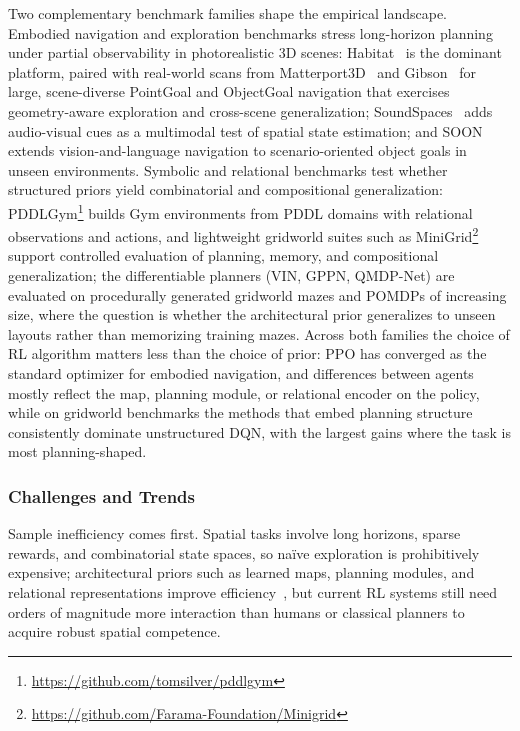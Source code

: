 Two complementary benchmark families shape the empirical landscape.
Embodied navigation and exploration benchmarks stress long-horizon planning under partial observability in photorealistic 3D scenes: Habitat~\cite{savva2019habitat} is the dominant platform, paired with real-world scans from Matterport3D~\cite{chang2017matterport3d} and Gibson~\cite{Xia2018Gibson} for large, scene-diverse PointGoal and ObjectGoal navigation that exercises geometry-aware exploration and cross-scene generalization; SoundSpaces~\cite{chen2020soundspaces} adds audio-visual cues as a multimodal test of spatial state estimation; and SOON~\cite{zhu2021soon} extends vision-and-language navigation to scenario-oriented object goals in unseen environments.
Symbolic and relational benchmarks test whether structured priors yield combinatorial and compositional generalization: PDDLGym\footnote{\url{https://github.com/tomsilver/pddlgym}} builds Gym environments from PDDL domains with relational observations and actions, and lightweight gridworld suites such as MiniGrid\footnote{\url{https://github.com/Farama-Foundation/Minigrid}} support controlled evaluation of planning, memory, and compositional generalization; the differentiable planners (VIN, GPPN, QMDP-Net) are evaluated on procedurally generated gridworld mazes and POMDPs of increasing size, where the question is whether the architectural prior generalizes to unseen layouts rather than memorizing training mazes.
Across both families the choice of RL algorithm matters less than the choice of prior: PPO has converged as the standard optimizer for embodied navigation, and differences between agents mostly reflect the map, planning module, or relational encoder on the policy, while on gridworld benchmarks the methods that embed planning structure consistently dominate unstructured DQN, with the largest gains where the task is most planning-shaped.


\subsubsection{Challenges and Trends}

Sample inefficiency comes first.
Spatial tasks involve long horizons, sparse rewards, and combinatorial state spaces, so na\"ive exploration is prohibitively expensive; architectural priors such as learned maps, planning modules, and relational representations improve efficiency~\cite{tamar2016valueiterationnetworks,zhang2021sampleefficientreinforcement}, but current RL systems still need orders of magnitude more interaction than humans or classical planners to acquire robust spatial competence.

